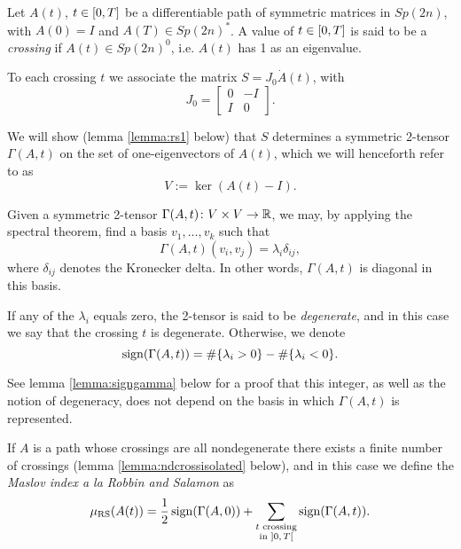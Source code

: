 \begin{definition}\label{def:murs}
Let $A(t)$, $t \in \interval0T$ be a differentiable path of symmetric matrices in $Sp(2n)$, with $A(0) = I$ and $A(T) \in Sp(2n)^*$. A value of $t \in \interval0T$ is said to be a \emph{crossing} if  $A(t) \in Sp(2n)^0$, i.e. $A(t)$ has 1 as an eigenvalue.

To each crossing $t$ we associate the matrix $S = J_0 \dot A(t)$, with
\begin{equation}
J_0 = \begin{bmatrix} 0 & -I \\ I & 0 \end{bmatrix}.
\end{equation}

We will show (lemma \ref{lemma:rs1} below) that $S$ determines a symmetric 2-tensor $\Gamma(A,t)$ on the set of one-eigenvectors of $A(t)$, which we will henceforth refer to as
\begin{equation}
V := \ker(A(t) - I).
\end{equation}

Given a symmetric 2-tensor $\Gamma(A,t) \colon V \times V \to \mathbb{R}$, we may, by applying the spectral theorem, find a basis $v_1, \dots, v_k$ such that
\begin{equation}
\Gamma(A,t)(v_i, v_j) = \lambda_i \delta_{ij},
\end{equation}
where $\delta_{ij}$ denotes the Kronecker delta. In other words, $\Gamma(A,t)$ is diagonal in this basis.

If any of the $\lambda_i$ equals zero, the 2-tensor is said to be \emph{degenerate}, and in this case we say that the crossing $t$ is degenerate. Otherwise, we denote
\begin{equation}
\operatorname{sign}(\Gamma(A,t)) = \#\{\lambda_i > 0\} - \#\{\lambda_i < 0\}.
\end{equation}

See lemma \ref{lemma:signgamma} below for a proof that this integer, as well as the notion of degeneracy, does not depend on the basis in which $\Gamma(A,t)$ is represented.

If $A$ is a path whose crossings are all nondegenerate there exists a finite number of crossings (lemma \ref{lemma:ndcrossisolated} below), and in this case we define the \emph{Maslov index \textit{a la} Robbin and Salamon} as
\begin{equation}\label{eq:mursdef}
\murs(A(t)) = \frac12 \sign(\Gamma(A,0)) + \sum_{\substack{\text{$t$ crossing}\\\text{in $\ointerval0T$}}} \sign(\Gamma(A,t)).
\end{equation}
\end{definition}

